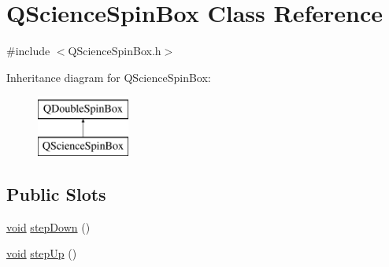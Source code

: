 \hypertarget{class_q_science_spin_box}{\section{Q\-Science\-Spin\-Box Class Reference}
\label{class_q_science_spin_box}
}


{\ttfamily \#include $<$Q\-Science\-Spin\-Box.\-h$>$}

Inheritance diagram for Q\-Science\-Spin\-Box\-:\begin{figure}[H]
\begin{center}
\leavevmode
\includegraphics[height=2.000000cm]{class_q_science_spin_box}
\end{center}
\end{figure}
\subsection*{Public Slots}
\begin{DoxyCompactItemize}
\item 
\hyperlink{group___u_a_v_objects_plugin_ga444cf2ff3f0ecbe028adce838d373f5c}{void} \hyperlink{class_q_science_spin_box_a70ad12674991043dec4a04ec698943dc}{step\-Down} ()
\item 
\hyperlink{group___u_a_v_objects_plugin_ga444cf2ff3f0ecbe028adce838d373f5c}{void} \hyperlink{class_q_science_spin_box_a5efe6986c88f143636c69aace39b849f}{step\-Up} ()
\end{DoxyCompactItemize}
